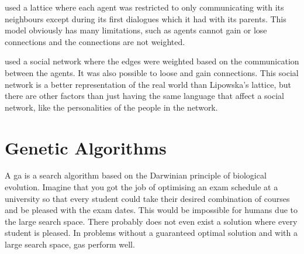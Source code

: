\citet{lipowska2011naming} used a lattice where each agent was restricted to only communicating with its neighbours except during its first dialogues which it had with its parents. This model obviously has many limitations, such as agents cannot gain or lose connections and the connections are not weighted. 

\citet{lekvam2014co} used a social network where the edges were weighted based on the communication between the agents. It was also possible to loose and gain connections. This social network is a better representation of the real world than Lipowska's lattice, but there are other factors than just having the same language that affect a social network, like the personalities of the people in the network.



\section{Genetic Algorithms} \label{GAalgorithm}
A \ac{ga} is a search algorithm based on the Darwinian principle of biological evolution. Imagine that you got the job of optimising an exam schedule at a university so that every student could take their desired combination of courses and be pleased with the exam dates. This would be impossible for humans due to the large search space. There probably does not even exist a solution where every student is pleased. In problems without a guaranteed optimal solution and with a large search space, \acp{ga} perform well.

